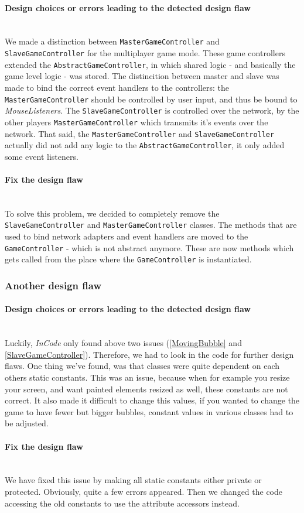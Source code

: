 \documentclass[a4paper]{article}
\begin{document}
\paragraph{Design choices or errors leading to the detected design flaw}\mbox{}\\
We made a distinction between \texttt{MasterGameController} and \texttt{SlaveGameController} for the multiplayer game mode. These game controllers extended the \texttt{AbstractGameController}, in which shared logic - and basically the game level logic - was stored. The distincition between master and slave was made to bind the correct event handlers to the controllers: the \texttt{MasterGameController} should be controlled by user input, and thus be bound to \textit{MouseListeners}. The \texttt{SlaveGameController} is controlled over the network, by the other players \texttt{MasterGameController} which transmits it's events over the network. That said, the \texttt{MasterGameController} and \texttt{SlaveGameController} actually did not add any logic to the \texttt{AbstractGameController}, it only added some event listeners.


\paragraph{Fix the design flaw}\mbox{}\\
To solve this problem, we decided to completely remove the \texttt{SlaveGameController} and \texttt{MasterGameController} classes. The methods that are used to bind network adapters and event handlers are moved to the \texttt{GameController} - which is not abstract anymore. These are now methods which gets called from the place where the \texttt{GameController} is instantiated.

\subsubsection{Another design flaw}\label{Statics}
\paragraph{Design choices or errors leading to the detected design flaw}\mbox{}\\
Luckily, \textit{InCode} only found above two issues (\ref{MovingBubble} and  \ref{SlaveGameController}). Therefore, we had to look in the code for further design flaws. One thing we've found, was that classes were quite dependent on each others static constants. This was an issue, because when for example you resize your screen, and want painted elements resized as well, these constants are not correct. It also made it difficult to change this values, if you wanted to change the game to have fewer but bigger bubbles, constant values in various classes had to be adjusted.

\paragraph{Fix the design flaw}\mbox{}\\
We have fixed this issue by making all static constants either private or protected. Obviously, quite a few errors appeared. Then we changed the code accessing the old constants to use the attribute accessors instead.
\end{document}
